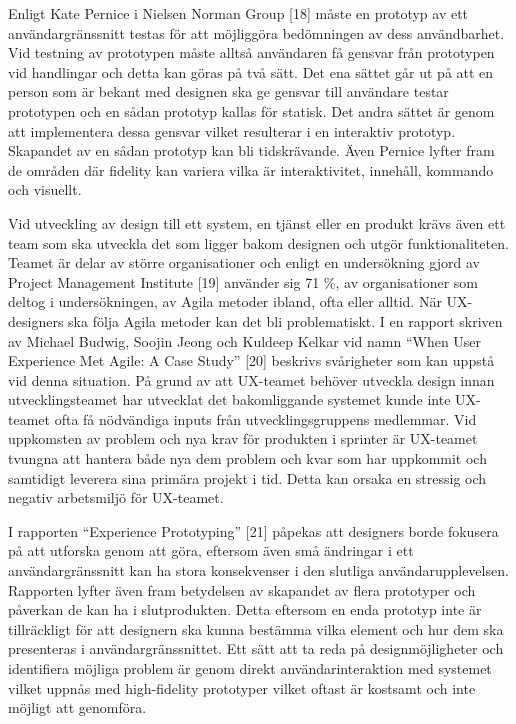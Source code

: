 \documentclass{kththesis}
\begin{document}
Enligt Kate Pernice i Nielsen Norman Group [18] måste en prototyp av ett användargränssnitt testas för att möjliggöra bedömningen av dess användbarhet. Vid testning av prototypen måste alltså användaren få gensvar från prototypen vid handlingar och detta kan göras på två sätt. Det ena sättet går ut på att en person som är bekant med designen ska ge gensvar till användare testar prototypen och en sådan prototyp kallas för statisk.  Det andra sättet är genom att implementera dessa gensvar vilket resulterar i en interaktiv prototyp. Skapandet av en sådan prototyp kan bli tidskrävande. Även Pernice lyfter fram de områden där fidelity kan variera vilka är interaktivitet, innehåll, kommando och visuellt. 

Vid utveckling av design till ett system, en tjänst eller en produkt krävs även ett team som ska utveckla det som ligger bakom designen och utgör funktionaliteten. Teamet är delar av större organisationer och enligt en undersökning gjord av Project Management Institute [19] använder sig 71 \%, av organisationer som deltog i undersökningen, av Agila metoder ibland, ofta eller alltid. När UX-designers ska följa Agila metoder kan det bli problematiskt. I en rapport skriven av Michael Budwig, Soojin Jeong och Kuldeep Kelkar vid namn “When User Experience Met Agile: A Case Study” [20] beskrivs svårigheter som kan uppstå vid denna situation. På grund av att UX-teamet behöver utveckla design innan utvecklingsteamet har utvecklat det bakomliggande systemet kunde inte UX-teamet ofta få nödvändiga inputs från utvecklingsgruppens medlemmar. Vid uppkomsten av problem och nya krav för produkten i sprinter är UX-teamet tvungna att hantera både nya dem problem och kvar som har uppkommit och samtidigt leverera sina primära projekt i tid. Detta kan orsaka en stressig och negativ arbetsmiljö för UX-teamet. 

I rapporten “Experience Prototyping” [21] påpekas att designers borde fokusera på att utforska genom att göra, eftersom även små ändringar i ett användargränssnitt kan ha stora konsekvenser i den slutliga användarupplevelsen. Rapporten lyfter även fram betydelsen av skapandet av flera prototyper och påverkan de kan ha i slutprodukten. Detta eftersom en enda prototyp inte är tillräckligt för att designern ska kunna bestämma vilka element och hur dem ska presenteras i användargränssnittet. Ett sätt att ta reda på designmöjligheter och identifiera möjliga problem är genom direkt användarinteraktion med systemet vilket uppnås med high-fidelity prototyper vilket oftast är kostsamt och inte möjligt att genomföra.
\end{document}
